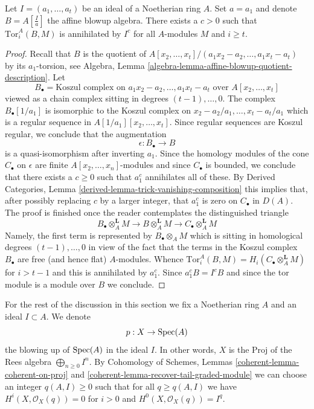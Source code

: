 \begin{lemma}
\label{lemma-annihilates-affine}
Let $I = (a_1, \ldots, a_t)$ be an ideal of a Noetherian ring $A$.
Set $a = a_1$ and denote $B = A[\frac{I}{a}]$ the affine blowup algebra.
There exists a $c > 0$ such that $\text{Tor}_i^A(B, M)$ is annihilated
by $I^c$ for all $A$-modules $M$ and $i \geq t$.
\end{lemma}

\begin{proof}
Recall that $B$ is the quotient of
$A[x_2, \ldots, x_t]/(a_1x_2 - a_2, \ldots, a_1x_t - a_t)$
by its $a_1$-torsion, see
Algebra, Lemma \ref{algebra-lemma-affine-blowup-quotient-description}. Let
$$
B_\bullet = \text{Koszul complex on }a_1x_2 - a_2, \ldots, a_1x_t - a_t
\text{ over }A[x_2, \ldots, x_t]
$$
viewed as a chain complex sitting in degrees $(t - 1), \ldots, 0$.
The complex $B_\bullet[1/a_1]$ is isomorphic to the Koszul complex
on $x_2 - a_2/a_1, \ldots, x_t - a_t/a_1$ which is a regular sequence
in $A[1/a_1][x_2, \ldots, x_t]$. Since regular sequences are
Koszul regular, we conclude that the augmentation
$$
\epsilon : B_\bullet \longrightarrow B
$$
is a quasi-isomorphism after inverting $a_1$. Since the homology modules
of the cone $C_\bullet$ on $\epsilon$ are finite $A[x_2, \ldots, x_n]$-modules
and since $C_\bullet$ is bounded,
we conclude that there exists a $c \geq 0$ such that $a_1^c$
annihilates all of these. By
Derived Categories, Lemma \ref{derived-lemma-trick-vanishing-composition}
this implies that, after possibly replacing $c$ by a larger integer,
that $a_1^c$ is zero on $C_\bullet$ in $D(A)$.
The proof is finished once the reader contemplates
the distinguished triangle
$$
B_\bullet \otimes_A^\mathbf{L} M \to
B \otimes_A^\mathbf{L} M \to
C_\bullet \otimes_A^\mathbf{L} M
$$
Namely, the first term is represented by $B_\bullet \otimes_A M$ which
is sitting in homological degrees $(t - 1), \ldots, 0$
in view of the fact that the terms in the Koszul complex $B_\bullet$
are free (and hence flat) $A$-modules. Whence
$\text{Tor}_i^A(B, M) = H_i(C_\bullet \otimes_A^\mathbf{L} M)$
for $i > t - 1$ and this is annihilated by $a_1^c$.
Since $a_1^cB = I^cB$ and since the tor module is a module
over $B$ we conclude.
\end{proof}

\noindent
For the rest of the discussion in this section we fix a Noetherian ring $A$
and an ideal $I \subset A$. We denote
$$
p : X \to \mathop{\mathrm{Spec}}(A)
$$
the blowing up of $\mathop{\mathrm{Spec}}(A)$ in the ideal $I$. In other words, $X$ is the
$\text{Proj}$ of the Rees algebra $\bigoplus_{n \geq 0} I^n$.
By Cohomology of Schemes, Lemmas \ref{coherent-lemma-coherent-on-proj} and
\ref{coherent-lemma-recover-tail-graded-module}
we can choose an integer $q(A, I) \geq 0$ such that for all $q \geq q(A, I)$
we have $H^i(X, \mathcal{O}_X(q)) = 0$ for
$i > 0$ and $H^0(X, \mathcal{O}_X(q)) = I^q$.

